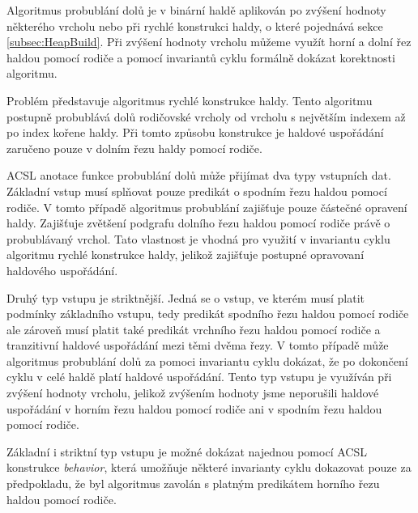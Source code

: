 Algoritmus probublání dolů je v binární haldě aplikován po zvýšení hodnoty některého vrcholu nebo při rychlé konstrukci haldy, o které pojednává sekce \ref{subsec:HeapBuild}. Při zvýšení hodnoty vrcholu můžeme využít horní a dolní řez haldou pomocí rodiče a pomocí invariantů cyklu formálně dokázat korektnosti algoritmu.

Problém představuje algoritmus rychlé konstrukce haldy. Tento algoritmu postupně probublává dolů rodičovské vrcholy od vrcholu s největším indexem až po index kořene haldy. Při tomto způsobu konstrukce je haldové uspořádání zaručeno pouze v dolním řezu haldy pomocí rodiče.

ACSL anotace funkce probublání dolů může přijímat dva typy vstupních dat. Základní vstup musí splňovat pouze predikát o spodním řezu haldou pomocí rodiče. V tomto případě algoritmus probublání zajišťuje pouze částečné opravení haldy. Zajišťuje zvětšení podgrafu dolního řezu haldou pomocí rodiče právě o probublávaný vrchol. Tato vlastnost je vhodná pro využití v invariantu cyklu algoritmu rychlé konstrukce haldy, jelikož zajišťuje postupné opravovaní haldového uspořádání.

Druhý typ vstupu je striktnější. Jedná se o vstup, ve kterém musí platit podmínky základního vstupu, tedy predikát spodního řezu haldou pomocí rodiče ale zároveň musí platit také predikát vrchního řezu haldou pomocí rodiče a tranzitivní haldové uspořádání mezi těmi dvěma řezy. V tomto případě může algoritmus probublání dolů za pomoci invariantu cyklu dokázat, že po dokončení cyklu v celé haldě platí haldové uspořádání. Tento typ vstupu je využíván při zvýšení hodnoty vrcholu, jelikož zvýšením hodnoty jsme neporušili haldové uspořádání v horním řezu haldou pomocí rodiče ani v spodním řezu haldou pomocí rodiče.

Základní i striktní typ vstupu je možné dokázat najednou pomocí ACSL konstrukce \textit{behavior}, která umožňuje některé invarianty cyklu dokazovat pouze za předpokladu, že byl algoritmus zavolán s platným predikátem horního řezu haldou pomocí rodiče.

